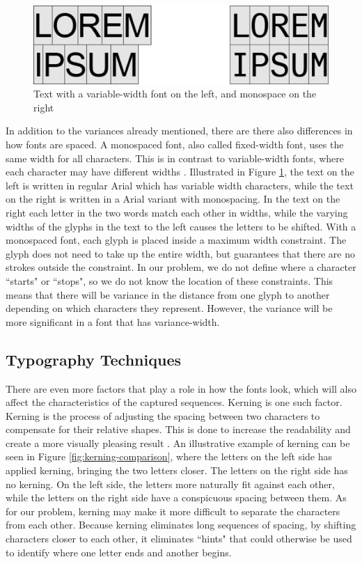 \begin{figure}[ht]
    \centering
    \includegraphics[width=1.0\textwidth]{fig/chapter2/regular_mono_comparison.png}
    \caption{Text with a variable-width font on the left, and monospace on the right}
    \label{fig:regular-mono-comparison}
\end{figure}

In addition to the variances already mentioned, there are there also differences in how fonts are spaced. A monospaced font, also called fixed-width font, uses the same width for all characters. This is in contrast to variable-width fonts, where each character may have different widths \citep{felici2011complete}. Illustrated in Figure \ref{fig:regular-mono-comparison}, the text on the left is written in regular Arial which has variable width characters, while the text on the right is written in a Arial variant with monospacing. In the text on the right each letter in the two words match each other in widths, while the varying widths of the glyphs in the text to the left causes the letters to be shifted. With a monospaced font, each glyph is placed inside a maximum width constraint. The glyph does not need to take up the entire width, but guarantees that there are no strokes outside the constraint. In our problem, we do not define where a character ``starts" or ``stops", so we do not know the location of these constraints. This means that there will be variance in the distance from one glyph to another depending on which characters they represent. However, the variance will be more significant in a font that has variance-width. 

\subsection{Typography Techniques}
\label{sec:other_factors}
There are even more factors that play a role in how the fonts look, which will also affect the characteristics of the captured sequences. Kerning is one such factor. Kerning is the process of adjusting the spacing between two characters to compensate for their relative shapes. This is done to increase the readability and create a more visually pleasing result \citep{felici2011complete}. An illustrative example of kerning can be seen in Figure \ref{fig:kerning-comparison}, where the letters on the left side has applied kerning, bringing the two letters closer. The letters on the right side has no kerning. On the left side, the letters more naturally fit against each other, while the letters on the right side have a conspicuous spacing between them. As for our problem, kerning may make it more difficult to separate the characters from each other. Because kerning eliminates long sequences of spacing, by shifting characters closer to each other, it eliminates ``hints" that could otherwise be used to identify where one letter ends and another begins.

